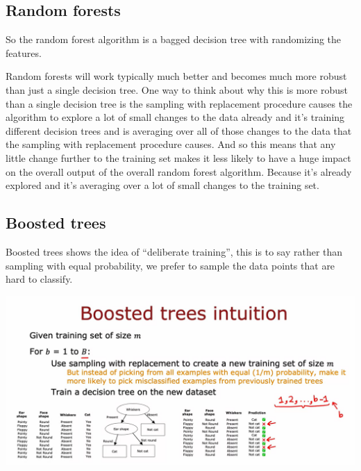 \subsection*{Random forests}
So the random forest algorithm is a bagged decision tree with randomizing the features.
\par
Random forests will work typically much better and 
becomes much more robust than just a single decision tree.
One way to think about why this is more robust than a single decision tree is the sampling with 
replacement procedure causes the algorithm to explore a lot of small changes to the data already 
and it's training different decision trees and is averaging over all of those changes to the
data that the sampling with replacement procedure causes. And so this means that any little
change further to the training set makes it less likely to have a huge impact on the overall output of 
the overall random forest algorithm. 
Because it's already explored and it's averaging over a lot of small changes to the training set.
\subsection*{Boosted trees}
Boosted trees shows the idea of ``deliberate training'', this is to say rather than sampling 
with equal probability, we prefer to sample the data points that are hard to classify.\par
\includegraphics*[width=\textwidth]{images/11.16}
